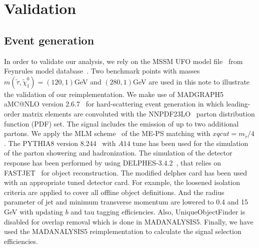 \documentclass{ws-mpla}
\begin{document}


\section{Validation}

\subsection{Event generation}

In order to validate our analysis, we rely on the MSSM UFO model file~\cite{Duhr:2011se} from Feynrules model database~\cite{Alloul:2013bka}. 
Two benchmark points with masses $ m(\tilde{\tau},\tilde{\chi}^0_1)=(120,1) $GeV and $ (280,1) $GeV are used in this note to illustrate the validation of our reimplementation. 
We make use of MADGRAPH5 aMC@NLO version 2.6.7~\cite{Alwall:2014hca} for hard-scattering event generation in which leading-order matrix elements are convoluted with the NNPDF23LO~\cite{Martin:2009iq} parton distribution function (PDF) set. The signal includes the emission of up to two additional partons. We apply the MLM scheme~\cite{Mangano:2006rw,Alwall:2008qv} of the ME-PS matching with $xqcut = m_{\tilde{\tau}}/4$. 
The PYTHIA8 version 8.244~\cite{Sjostrand:2007gs} with $A14$ tune has been used for the simulation of the parton showering and hadronization. The simulation of the detector response has been performed by using DELPHES-3.4.2~\cite{deFavereau:2013fsa}, that relies on FASTJET~\cite{Cacciari:2011ma} for object reconstruction.
The modified delphes card has been used with an appropriate tuned detector card.
For example, the loosened isolation criteria are applied to cover all offline object definitions.
And the radius parameter of jet and minimum transverse momentum are lowered to 0.4 and 15 GeV with updating $b$ and tau tagging efficiencies.
Also, UniqueObjectFinder is disabled for overlap removal which is done in MADANALYSIS5.
Finally, we have used the MADANALYSIS5 reimplementation to calculate the signal selection efficiencies.
\end{document}
